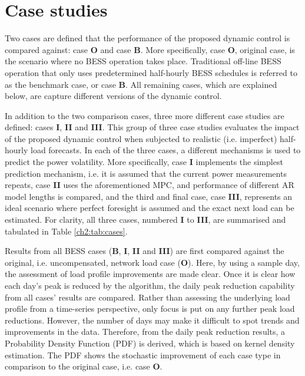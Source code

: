 \section{Case studies}
\label{ch2:sec:case-studies}

Two cases are defined that the performance of the proposed dynamic control is compared against: case \textbf{O} and case \textbf{B}.
More specifically, case \textbf{O}, original case, is the scenario where no BESS operation takes place.
Traditional off-line BESS operation that only uses predetermined half-hourly BESS schedules is referred to as the benchmark case, or case \textbf{B}.
All remaining cases, which are explained below, are capture different versions of the dynamic control.

In addition to the two comparison cases, three more different case studies are defined: cases \textbf{I}, \textbf{II} and \textbf{III}.
This group of three case studies evaluates the impact of the proposed dynamic control when subjected to realistic (i.e. imperfect) half-hourly load forecasts.
In each of the three cases, a different mechanisms is used to predict the power volatility.
More specifically, case \textbf{I} implements the simplest prediction mechanism, i.e. it is assumed that the current power measurements repeats, case \textbf{II} uses the aforementioned MPC, and performance of different AR model lengths is compared, and the third and final case, case \textbf{III}, represents an ideal scenario where perfect foresight is assumed and the exact next load can be estimated.
For clarity, all three cases, numbered \textbf{I} to \textbf{III}, are summarised and tabulated in Table \ref{ch2:tab:cases}.



Results from all BESS cases (\textbf{B}, \textbf{I}, \textbf{II} and \textbf{III}) are first compared against the original, i.e. uncompensated, network load case (\textbf{O}).
Here, by using a sample day, the assessment of load profile improvements are made clear.
Once it is clear how each day's peak is reduced by the algorithm, the daily peak reduction capability from all cases' results are compared.
Rather than assessing the underlying load profile from a time-series perspective, only focus is put on any further peak load reductions.
However, the number of days may make it difficult to spot trends and improvements in the data.
Therefore, from the daily peak reduction results, a Probability Density Function (PDF) is derived, which is based on kernel density estimation.
The PDF shows the stochastic improvement of each case type in comparison to the original case, i.e. case \textbf{O}.
